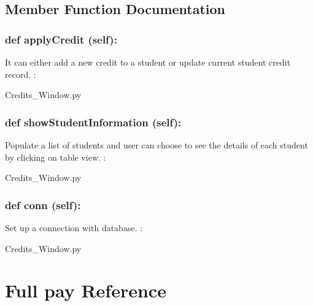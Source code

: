 \subsection{Member Function Documentation}
\hypertarget{class_poly_a14a7ad77ce612b0c54f531d307ee4b39}{
\subsubsection[{def applyCredit (self):}]{\setlength{\rightskip}{0pt plus 5cm}def {applyCredit} (self):}}\label{class_poly_a14a7ad77ce612b0c54f531d307ee4b39}
It can either add a new credit to a student or update current student credit record.
:\begin{DoxyCompactItemize}
\item 
Credits\_Window.\-py\end{DoxyCompactItemize}

\hypertarget{class_poly_a14a7ad77ce612b0c54f531d307ee4b39}{
\subsubsection[{def showStudentInformation (self):}]{\setlength{\rightskip}{0pt plus 5cm}def {showStudentInformation} (self):}}\label{class_poly_a14a7ad77ce612b0c54f531d307ee4b39}
Populate a list of students and user can choose to see the details of each student by clicking on table view.
:\begin{DoxyCompactItemize}
\item 
Credits\_Window.\-py\end{DoxyCompactItemize}


\hypertarget{class_poly_a14a7ad77ce612b0c54f531d307ee4b39}{
\subsubsection[{def conn (self):}]{\setlength{\rightskip}{0pt plus 5cm}def {conn} (self):}}\label{class_poly_a14a7ad77ce612b0c54f531d307ee4b39}
Set up a connection with database.
:\begin{DoxyCompactItemize}
\item 
Credits\_Window.\-py\end{DoxyCompactItemize}


\hypertarget{Full_pay}{\section{Full pay Reference}
\label{Full_pay}
}
